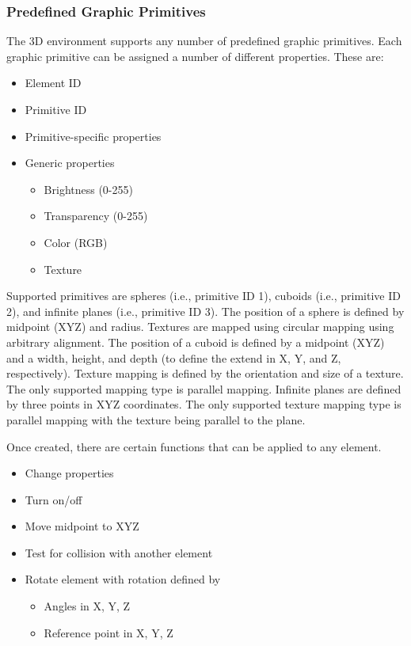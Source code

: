 \documentclass[letterpaper,oneside,12pt]{article}
\begin{document}
\subsubsection{Predefined Graphic Primitives}
The 3D environment supports any number of predefined graphic primitives. 
Each graphic primitive can be assigned a number of different properties. 
These are:
\begin{itemize}
 \item Element ID
 \item Primitive ID
 \item Primitive-specific properties
 \item Generic properties
       \begin{itemize}
        \item Brightness (0-255)
        \item Transparency (0-255)
        \item Color (RGB)
        \item Texture
       \end{itemize}
\end{itemize}
Supported primitives are spheres (i.e., primitive ID 1), cuboids (i.e., primitive ID 2), 
and infinite planes (i.e., primitive ID 3). The position
of a sphere is defined by midpoint (XYZ) and radius. Textures are mapped using
circular mapping using arbitrary alignment. The position of a cuboid is defined
by a midpoint (XYZ) and a width, height, and depth (to define the extend in 
X, Y, and Z, respectively). Texture mapping is defined by the orientation and
size of a texture. The only supported mapping type is parallel mapping.
Infinite planes are defined by three points in XYZ coordinates. The only supported
texture mapping type is parallel mapping with the texture being parallel to the plane.

Once created, there are certain functions that can be applied to any element.
\begin{itemize}
 \item Change properties
 \item Turn on/off
 \item Move midpoint to XYZ
 \item Test for collision with another element
 \item Rotate element with rotation defined by
       \begin{itemize}
        \item Angles in X, Y, Z
        \item Reference point in X, Y, Z
       \end{itemize}
\end{itemize}
\end{document}
